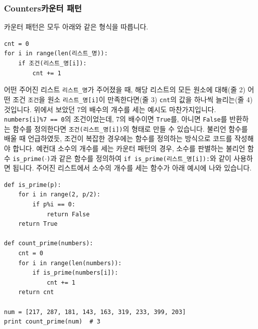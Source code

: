 \documentclass[../main.tex]{subfiles}
\begin{document}
\subsubsection{Counters카운터 패턴}
카운터 패턴은 모두 아래와 같은 형식을 따릅니다.
\begin{verbatim}
cnt = 0
for i in range(len(리스트_명)):
	if 조건(리스트_명[i]):
		cnt += 1
\end{verbatim}
어떤 주어진 리스트 \texttt{리스트\_명}가 주어졌을 때, 해당 리스트의 모든 원소에 대해(줄 2) 어떤 조건 \texttt{조건}을 원소 \texttt{리스트\_명[i]}이 만족한다면(줄 3) \texttt{cnt}의 값을 하나씩 늘리는(줄 4) 것입니다.
위에서 보았던 7의 배수의 개수를 세는 예시도 마찬가지입니다.
\texttt{numbers[i]\%7 == 0}의 조건이었는데, 7의 배수이면 \texttt{True}를, 아니면 \texttt{False}를 반환하는 함수를 정의한다면 \texttt{조건(리스트\_명[i])}의 형태로 만들 수 있습니다.
불리언 함수를 배울 때 언급하였듯, 조건이 복잡한 경우에는 함수를 정의하는 방식으로 코드를 작성해야 합니다.
예컨대 소수의 개수를 세는 카운터 패턴의 경우, 소수를 판별하는 불리언 함수 \texttt{is\_prime($\cdot$)}과 같은 함수를 정의하여 \texttt{if is\_prime(리스트\_명[i]):}와 같이 사용하면 됩니다.
주어진 리스트에서 소수의 개수를 세는 함수가 아래 예시에 나와 있습니다.
\begin{verbatim}
def is_prime(p):
	for i in range(2, p/2):
		if p%i == 0:
			return False
	return True
	
def count_prime(numbers):
	cnt = 0
	for i in range(len(numbers)):
		if is_prime(numbers[i]):
			cnt += 1
	return cnt

num = [217, 287, 181, 143, 163, 319, 233, 399, 203]
print count_prime(num)  # 3
\end{verbatim}
\end{document}
